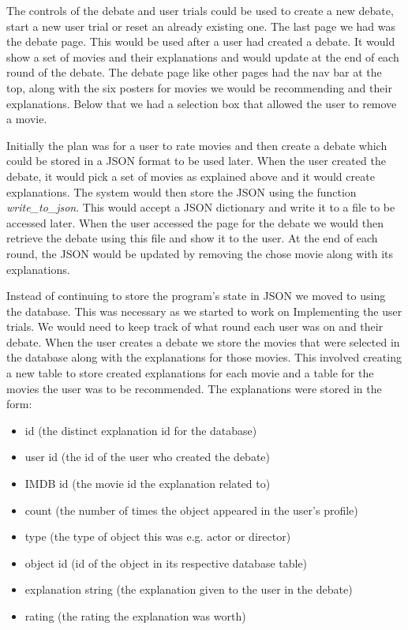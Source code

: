                 The controls of the debate and user trials could be used to create a new debate, start a new user trial or reset an already existing one. The last page we had was the debate page. This would be used after a user had created a debate. It would show a set of movies and their explanations and would update at the end of each round of the debate. The debate page like other pages had the nav bar at the top, along with the six posters for movies we would be recommending and their explanations. Below that we had a selection box that allowed the user to remove a movie.

                Initially the plan was for a user to rate movies and then create a debate which could be stored in a JSON format to be used later. When the user created the debate, it would pick a set of movies as explained above and it would create explanations. The system would then store the JSON using the function \textit{write\_to\_json}. This would accept a JSON dictionary and write it to a file to be accessed later. When the user accessed the page for the debate we would then retrieve the debate using this file and show it to the user. At the end of each round, the JSON would be updated by removing the chose movie along with its explanations. 

                Instead of continuing to store the program's state in JSON we moved to using the database. This was necessary as we started to work on Implementing the user trials. We would need to keep track of what round each user was on and their debate. When the user creates a debate we store the movies that were selected in the database along with the explanations for those movies. This involved creating a new table to store created explanations for each movie and a table for the movies the user was to be recommended. The explanations were stored in the form:

                \begin{itemize}
                    \item id (the distinct explanation id for the database)
                    \item user id (the id of the user who created the debate)
                    \item IMDB id (the movie id the explanation related to)
                    \item count (the number of times the object appeared in the user's profile)
                    \item type  (the type of object this was e.g. actor or director)
                    \item object id (id of the object in its respective database table)
                    \item explanation string (the explanation given to the user in the debate)
                    \item rating (the rating the explanation was worth)
                \end{itemize}
                
